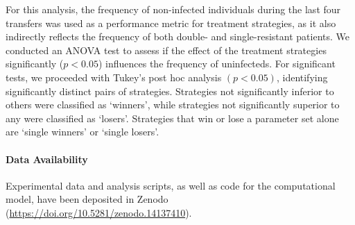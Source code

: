 For this analysis, the frequency of non-infected individuals during the last four transfers was used as a performance metric for treatment strategies, as it also indirectly reflects the frequency of both double- and single-resistant patients.
We conducted an ANOVA test to assess if the effect of the treatment strategies significantly ($p<0.05$) influences the frequency of uninfecteds.
For significant tests, we proceeded with Tukey's post hoc analysis \((p < 0.05)\), identifying significantly distinct pairs of strategies.
Strategies not significantly inferior to others were classified as `winners', while strategies not significantly superior to any were classified as `losers'.
Strategies that win or lose a parameter set alone are `single winners' or `single losers'.

\paragraph{Data Availability}
Experimental data and analysis scripts, as well as code for the computational model, have been deposited in Zenodo (\url{https://doi.org/10.5281/zenodo.14137410}).
